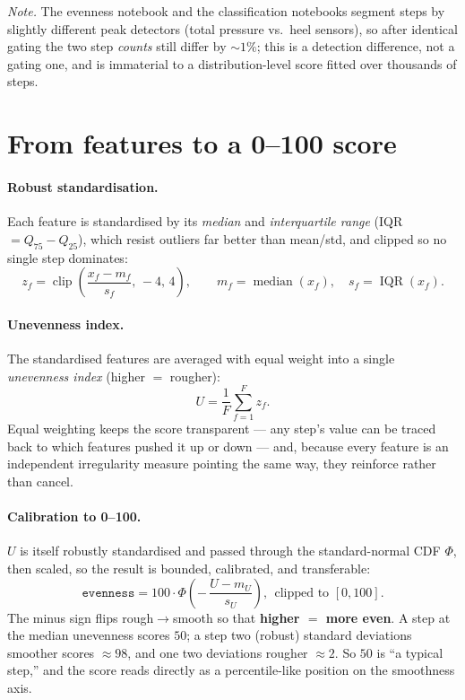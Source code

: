 \documentclass[11pt]{article}
\newcommand{\code}[1]{\texttt{#1}}
\begin{document}
\medskip\noindent\emph{Note.} The evenness notebook and the classification notebooks segment steps
by slightly different peak detectors (total pressure vs.\ heel sensors), so after identical gating
the two step \emph{counts} still differ by ${\sim}1\%$; this is a detection difference, not a gating
one, and is immaterial to a distribution-level score fitted over thousands of steps.

\section{From features to a 0--100 score}

\paragraph{Robust standardisation.} Each feature is standardised by its \emph{median} and
\emph{interquartile range} (IQR $=Q_{75}-Q_{25}$), which resist outliers far better than mean/std,
and clipped so no single step dominates:
\begin{equation}
z_f = \operatorname{clip}\!\left(\frac{x_f-m_f}{s_f},\,-4,\,4\right),
\qquad m_f=\operatorname{median}(x_f),\quad s_f=\operatorname{IQR}(x_f).
\end{equation}

\paragraph{Unevenness index.} The standardised features are averaged with equal weight into a single
\emph{unevenness index} (higher $=$ rougher):
\begin{equation}
U=\frac{1}{F}\sum_{f=1}^{F} z_f .
\end{equation}
Equal weighting keeps the score transparent --- any step's value can be traced back to which
features pushed it up or down --- and, because every feature is an independent irregularity
measure pointing the same way, they reinforce rather than cancel.

\paragraph{Calibration to 0--100.} $U$ is itself robustly standardised and passed through the
standard-normal CDF $\Phi$, then scaled, so the result is bounded, calibrated, and transferable:
\begin{equation}
\boxed{\ \code{evenness}=100\cdot\Phi\!\left(-\,\frac{U-m_U}{s_U}\right),\ \ \text{clipped to }[0,100].\ }
\end{equation}
The minus sign flips rough$\to$smooth so that \textbf{higher $=$ more even}. A step at the median
unevenness scores $50$; a step two (robust) standard deviations smoother scores $\approx 98$, and one
two deviations rougher $\approx 2$. So $50$ is ``a typical step,'' and the score reads directly as a
percentile-like position on the smoothness axis.
\end{document}

